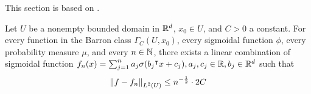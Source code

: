 This section is based on \cite{barronUniversalApproximationBounds1993}.

\begin{theorem}
    \label{thm:barron_1993_1}
    Let $U$ be a nonempty bounded domain in $\mathbb{R}^d$, $x_0 \in U$, and $C > 0$ a
    constant. For every function in the Barron class $\Gamma_C(U, x_0)$, every
    sigmoidal function $\phi$, every probability measure $\mu$, and every $n \in
    \mathbb{N}$, there exists a linear combination of sigmoidal function $f_n(x) =
    \sum_{j=1}^n a_j \sigma(b_j{}^{\intercal} x+c_j), a_j, c_j \in \mathbb{R}, b_j \in \mathbb{R}^d$ such
    that
    \begin{equation}
        \left\| f - f_n \right\|_{L^{2}(U)}\leq n^{-\frac{1}{2}} \cdot 2C
    \end{equation}
\end{theorem}


